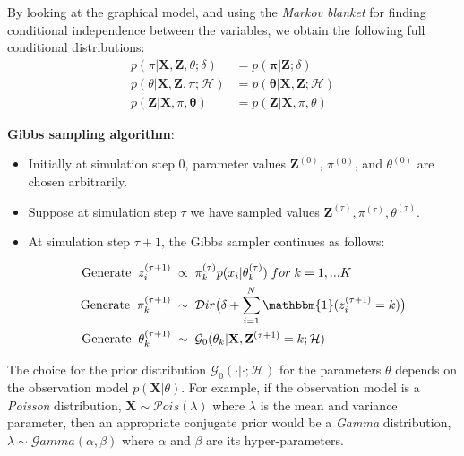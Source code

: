 By looking at the graphical model, and using the \emph{Markov blanket} for finding conditional independence between the variables, we obtain the following full conditional distributions:
\begin{equation}%
  \begin{aligned}
	p(\pi|\mathbf{X},\mathbf{Z},\theta;\delta) & = p(\mathbf{\pi} | \mathbf{Z};\delta) \\ 
	p(\theta|\mathbf{X},\mathbf{Z},\pi;\mathcal{H}) & = p(\mathbf{\theta}|\mathbf{X},\mathbf{Z};\mathcal{H})  \\
	p(\mathbf{Z}|\mathbf{X},\pi, \mathbf{\theta}) & = p(\mathbf{Z}|\mathbf{X},\pi, \theta)
  \end{aligned}
\end{equation}

\noindent\textbf{Gibbs sampling algorithm}: 
\begin{itemize}
\item {Initially at simulation step 0, parameter values $\mathbf{Z}^{(0)}$, $\pi^{(0)}$, and $\theta^{(0)}$ are chosen arbitrarily.}
\item {Suppose at simulation step $\tau$ we have sampled values $\mathbf{Z}^{(\tau)}, \pi^{(\tau)}, \theta^{(\tau)}$.}
\item { At simulation step $\tau + 1$, the Gibbs sampler continues as follows:

\begin{equation*}%
  \begin{aligned}
    \text{Generate} \; \; z_{i}^{(\tau+1)} \; & \propto \; \pi_{k}^{(\tau)}p(x_{i}|\theta_{k}^{(\tau)}) \; for \; k=1,...K \\
    \text{Generate} \; \; \pi_{k}^{(\tau+1)} \; & \sim \; \mathcal{D}ir\big(\delta + \sum_{i=1}^{N}\mathbbm{1}(z_{i}^{(\tau+1)}=k)\big) \\
    \text{Generate} \; \; \theta_{k}^{(\tau+1)} \; & \sim \; \mathcal{G}_{0}(\theta_{k}| \mathbf{X}, \mathbf{Z}^{(\tau+1)}=k; \mathcal{H})
  \end{aligned}
\end{equation*}
}
\end{itemize}

The choice for the prior distribution $\mathcal{G}_{0}(\cdot| \cdot; \mathcal{H})$ for the parameters $\theta$ depends on the observation model $p(\mathbf{X}|\theta)$. For example, if the observation model is a \emph{Poisson} distribution, \ie $\mathbf{X} \sim \mathcal{P}ois(\lambda)$ where $\lambda$ is the mean and variance parameter, then an appropriate conjugate prior would be a \emph{Gamma} distribution, \ie $\lambda \sim \mathcal{G}amma(\alpha, \beta)$ where $\alpha$ and $\beta$ are its hyper-parameters.